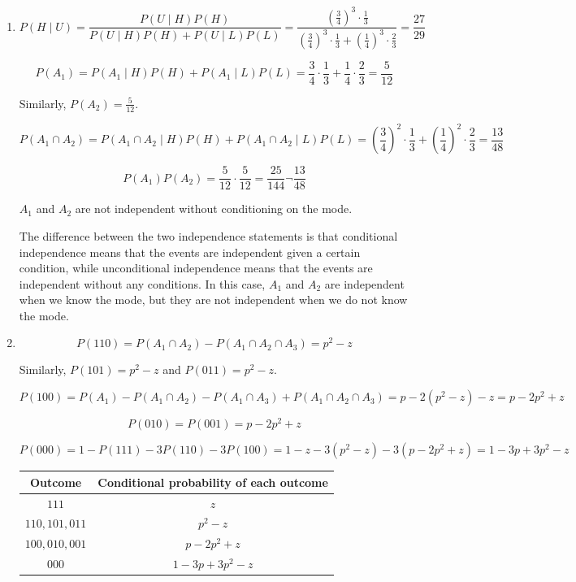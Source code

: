 \documentclass[11pt,a4paper]{article}
\begin{document}
\begin{enumerate}
    \item[(a)]

    $$
    P(H \mid U)
    = \frac{P(U \mid H) P(H)}{P(U \mid H) P(H) + P(U \mid L) P(L)}
    = \frac{(\frac 34)^3 \cdot \frac 13}{(\frac 34)^3 \cdot \frac 13 + (\frac 14)^3 \cdot \frac 23}
    = \frac{27}{29}
    $$

    $$
    P(A_1)
    = P(A_1 \mid H) P(H) + P(A_1 \mid L) P(L)
    = \frac 34 \cdot \frac 13 + \frac 14 \cdot \frac 23
    = \frac{5}{12}
    $$

    Similarly, $P(A_2) = \frac{5}{12}$.

    $$
    P(A_1 \cap A_2)
    = P(A_1 \cap A_2 \mid H) P(H) + P(A_1 \cap A_2 \mid L) P(L)
    = (\frac 34)^2 \cdot \frac 13 + (\frac 14)^2 \cdot \frac 23
    = \frac{13}{48}
    $$

    $$
    P(A_1) P(A_2) = \frac{5}{12} \cdot \frac{5}{12} = \frac{25}{144} \neg \frac{13}{48}
    $$

    $A_1$ and $A_2$ are not independent without conditioning on the mode.

    The difference between the two independence statements is that conditional independence means that the events are independent given a certain condition, while unconditional independence means that the events are independent without any conditions. In this case, $A_1$ and $A_2$ are independent when we know the mode, but they are not independent when we do not know the mode.

    \item[(b)]
    
    $$
    P(110) = P(A_1 \cap A_2) - P(A_1 \cap A_2 \cap A_3) = p^2 - z
    $$

    Similarly, $P(101) = p^2 - z$ and $P(011) = p^2 - z$.

    $$
    P(100) = P(A_1) - P(A_1 \cap A_2) - P(A_1 \cap A_3) + P(A_1 \cap A_2 \cap A_3) = p - 2(p^2 - z) - z = p - 2p^2 + z
    $$

    $$
    P(010) = P(001) = p - 2p^2 + z
    $$

    $$
    P(000) = 1 - P(111) - 3P(110) - 3P(100) = 1 - z - 3(p^2 - z) - 3(p - 2p^2 + z) = 1 - 3p + 3p^2 - z
    $$

    \begin{center}
    \begin{tabular}{cc}
    \toprule Outcome & Conditional probability of each outcome\\\midrule
    $111$ & $z$\\
    $110,101,011$ & $p^2 - z$\\
    $100,010,001$ & $p - 2p^2 + z$\\
    $000$ & $1 - 3p + 3p^2 - z$\\\bottomrule
    \end{tabular}
    \end{center}


\end{enumerate}
\end{document}
